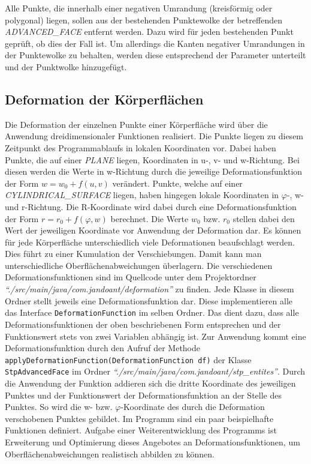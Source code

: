 Alle Punkte, die innerhalb einer negativen Umrandung (kreisförmig oder polygonal) liegen, sollen aus der bestehenden Punktewolke der betreffenden \textit{ADVANCED\_FACE} entfernt werden. Dazu wird für jeden bestehenden Punkt geprüft, ob dies der Fall ist. Um allerdings die Kanten negativer Umrandungen in der Punktewolke zu behalten, werden diese entsprechend der Parameter unterteilt und der Punktwolke hinzugefügt.

\subsection{Deformation der Körperflächen}

Die Deformation der einzelnen Punkte einer Körperfläche wird über die Anwendung dreidimensionaler Funktionen realisiert. Die Punkte liegen zu diesem Zeitpunkt des Programmablaufs in lokalen Koordinaten vor. Dabei haben Punkte, die auf einer \textit{PLANE} liegen, Koordinaten in u-, v- und w-Richtung. Bei diesen werden die Werte in w-Richtung durch die jeweilige Deformationsfunktion der Form $w = w_0 + f(u,v)$ verändert. Punkte, welche auf einer \textit{CYLINDRICAL\_SURFACE} liegen, haben hingegen lokale Koordinaten in $\varphi$-, w- und r-Richtung. Die R-Koordinate wird dabei durch eine Deformationsfunktion der Form $r=r_0+f(\varphi, w)$ berechnet. Die Werte $w_0$ bzw. $r_0$ stellen dabei den Wert der jeweiligen Koordinate vor Anwendung der Deformation dar.
Es können für jede Körperfläche unterschiedlich viele Deformationen beaufschlagt werden. Dies führt zu einer Kumulation der Verschiebungen. Damit kann man unterschiedliche Oberflächenabweichungen überlagern.
Die verschiedenen Deformationsfunktionen sind im Quellcode unter dem Projektordner \textit{"`./src/\-main/\-java/\-com.jandoant/deformation"'} zu finden. Jede Klasse in diesem Ordner stellt jeweils eine Deformationsfunktion dar. Diese implementieren alle das Interface \verb|DeformationFunction| im selben Ordner. Das dient dazu, dass alle Deformationsfunktionen der oben beschriebenen Form entsprechen und der Funktionswert stets von zwei Variablen abhängig ist. Zur Anwendung kommt eine Deformationsfunktion durch den Aufruf der Methode \verb|applyDeformationFunction(DeformationFunction df)| der Klasse \verb|StpAdvancedFace| im Ordner \textit{"`./src/\-main/\-java/\-com.jandoant/stp\_entites"'}. Durch die Anwendung der Funktion addieren sich die dritte Koordinate des jeweiligen Punktes und der Funktionswert der Deformationsfunktion an der Stelle des Punktes. So wird die w- bzw. $\varphi$-Koordinate des durch die Deformation verschobenen Punktes gebildet. Im Programm sind ein paar beispielhafte Funktionen definiert. Aufgabe einer Weiterentwicklung des Programms ist Erweiterung und Optimierung dieses Angebotes an Deformationsfunktionen, um Oberflächenabweichungen realistisch abbilden zu können.


